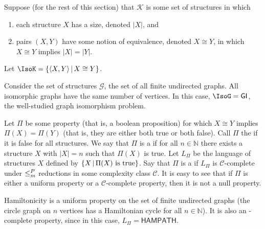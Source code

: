 Suppose (for the rest of this section) that $\mathcal{K}$ is some set of structures in which
\begin{enumerate}
\item each structure $X$ has a size, denoted $|X|$, and
\item pairs $(X, Y)$ have some notion of equivalence, denoted $X\cong Y$, in which $X\cong Y$ implies $|X|=|Y|$.
\end{enumerate}
Let $\IsoK=\lb\pair{X}{Y}\st X\cong Y\rb$.
\begin{example}
  Consider the set of structures $\mathcal{G}$, the set of all finite undirected graphs.
  All isomorphic graphs have the same number of vertices.
  In this case, $\IsoG=\GI$, the well-studied graph isomorphism problem.
\end{example}

Let $\Pi$ be some property (that is, a boolean proposition) for which $X\cong Y$ implies $\Pi(X)=\Pi(Y)$ (that is, they are either both true or both false).
Call $\Pi$ the  if it is false for all structures.
We say that $\Pi$ is a  if for all $n\in\mathbb{N}$ there exists a structure $X$ with $|X|=n$ such that $\Pi(X)$ is true.
Let $L_\Pi$ be the language of structures $X$ defined by $\left\{ X\,\middle|\,\Pi(X)\textnormal{ is true}\right\}$.
Say that $\Pi$ is a  if $L_\Pi$ is $\mathcal{C}$-complete under $\leq^{P}_{m}$ reductions in some complexity class $\mathcal{C}$.
It is easy to see that if $\Pi$ is either a uniform property or a $\mathcal{C}$-complete property, then it is not a null property.
\begin{example}
  Hamiltonicity is a uniform property on the set of finite undirected graphs (the circle graph on $n$ vertices has a Hamiltonian cycle for all $n\in\mathbb{N}$).
  It is also an \NP-complete property, since in this case, $L_\Pi=\mathsf{HAMPATH}$.
\end{example}

